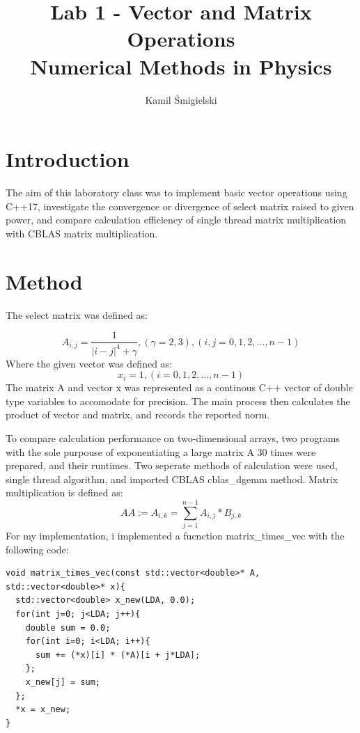 \documentclass{article}
\begin{document}
\title{Lab 1 - Vector and Matrix Operations\\
\large{Numerical Methods in Physics}}
\author{Kamil Śmigielski}

\maketitle

\section{Introduction}

The aim of this laboratory class was to implement basic vector operations using C++17, investigate the convergence or divergence of select matrix raised to given power, and compare calculation efficiency of single thread matrix multiplication with CBLAS matrix multiplication.

\section{Method}

The select matrix was defined as:

\begin{equation}
    A_{i,j} = \frac{1}{|i-j|^4 + \gamma},(\gamma =2, 3),(i,j=0,1,2,...,n-1)
\end{equation}
Where the given vector was defined as:
\begin{equation}
    x_{i} = 1,(i=0,1,2,...,n-1)
\end{equation}
The matrix A and vector x was represented as a continous C++ vector of double type variables to accomodate for precision. The main process then calculates the product of vector and matrix, and records the reported norm.

To compare calculation performance on two-dimensional arrays, two programs with the sole purpouse of exponentiating a large matrix A 30 times were prepared, and their runtimes. Two seperate methods of calculation were used, single thread algorithm, and imported CBLAS cblas\_dgemm method.
Matrix multiplication is defined as:
\begin{equation}
    AA:= A_{i,k} =\sum_{j = 1}^{n-1}A_{i,j}*B_{j,k}  
\end{equation}
For my implementation, i implemented a fucnction matrix\_times\_vec with the following code:
\newpage 
\begin{verbatim}
void matrix_times_vec(const std::vector<double>* A, std::vector<double>* x){
  std::vector<double> x_new(LDA, 0.0);
  for(int j=0; j<LDA; j++){
    double sum = 0.0;
    for(int i=0; i<LDA; i++){
      sum += (*x)[i] * (*A)[i + j*LDA];
    };
    x_new[j] = sum;
  };
  *x = x_new;
}
\end{verbatim}
\end{document}
